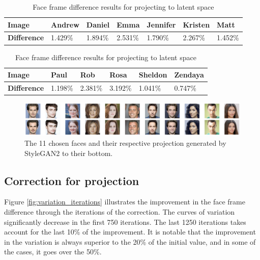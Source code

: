 \documentclass[review]{elsarticle}
\begin{document}
\begin{table}[H]
\begin{tabular}{|l|l|l|l|l|l|l|}
\hline
\textbf{Image} & Andrew & Daniel & Emma & Jennifer & Kristen & Matt \\ \hline
\textbf{Difference} & 1.429\% & 1.894\% & 2.531\% & 1.790\% & 2.267\% & 1.452\% \\ \hline
\end{tabular}

\begin{tabular}{|l|l|l|l|l|l|}
\hline
\textbf{Image} & Paul & Rob & Rosa & Sheldon & Zendaya \\ \hline
\textbf{Difference} & 1.198\% & 2.381\% & 3.192\% & 1.041\% & 0.747\% \\ \hline
\end{tabular}

  \caption{Face frame difference results for projecting to latent space}
  \label{table:projection}
\end{table}

\begin{figure}[H]
  \includegraphics[width=\linewidth, center]{Images/faces_with_projection.png}
  \caption{The 11 chosen faces and their respective projection generated by StyleGAN2 to their bottom.}
  \label{fig:projections}
\end{figure}

\subsection{Correction for projection}

Figure \ref{fig:variation_iterations} illustrates the improvement in the face frame difference through the iterations of the correction. The curves of variation significantly decrease in the first 750 iterations. The last 1250 iterations takes account for the last 10\% of the improvement. It is notable that the improvement in the variation is always superior to the 20\% of the initial value, and in some of the cases, it goes over the 50\%. 
\end{document}
